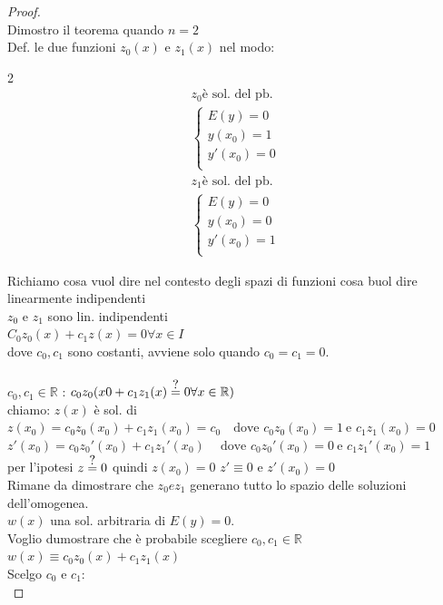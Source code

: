 \documentclass[a4paper, oneside]{article}
\newcommand\eqq{\stackrel{\mathclap{\normalfont\mbox{?}}}{=}}
\begin{document}
\begin{proof}
    \hfil\\
    Dimostro il teorema quando $n=2$\\
    Def. le due funzioni $z_0(x)$ e $z_1(x)$ nel modo:\\
    \begin{multicols}{2}
        \noindent
    \begin{gather*}
       z_0 \text{è sol. del pb.}\\
       \begin{cases}
        E(y) = 0\\
        y(x_0) = 1\\
        y'(x_0) = 0\\
       \end{cases}
    \end{gather*}
    \begin{gather*}
       z_1 \text{è sol. del pb.}\\
       \begin{cases}
        E(y) = 0\\
        y(x_0) = 0\\
        y'(x_0) = 1\\
       \end{cases}
    \end{gather*}
        \columnbreak
    \end{multicols}
    
    Richiamo cosa vuol dire nel contesto degli spazi di funzioni cosa buol dire linearmente indipendenti\\
    $z_0$ e $z_1$ sono lin. indipendenti \\
    $C_0 z_0(x) + c_1 z(x) = 0 \forall x \in I$\\
    dove $c_0, c_1$ sono costanti, avviene solo quando $c_0 = c_1 = 0.$\\
    \\ $c_0, c_1 \in \mathbb{R}$ : $c_0 z_0(x0 + c_1 z_1(x) \eqq 0 \forall x \in \mathbb{R})$\\
    chiamo: $z(x) $ è sol. di $z(x_0) = c_0 z_0(x_0) + c_1 z_1(x_0) = c_0 \quad \text{dove } c_0 z_0(x_0) = 1 \ \text{e } c_1 z_1(x_0) = 0$\\
    $z'(x_0) = c_0 z_0'(x_0) + c_1 z_1'(x_0) \quad \ \text{dove } c_0 z_0'(x_0)=0 \ \text{e } c_1 z_1'(x_0)= 1$\\
     per l'ipotesi $z \eqq 0$ quindi $z(x_0) = 0$  $z' \equiv 0 $ e $z'(x_0) = 0$\\
    Rimane da dimostrare che $z_0 e z_1$ generano tutto lo spazio delle soluzioni dell'omogenea.\\
     $w(x)$ una sol. arbitraria di $E(y) = 0$.\\
    Voglio dumostrare che è probabile scegliere $c_0, c_1 \in \mathbb{R}$\\
     $w(x) \equiv c_0 z_0(x) + c_1 z_1(x)$\\
    Scelgo $c_0$ e $c_1$:\\


\end{proof}
\end{document}
